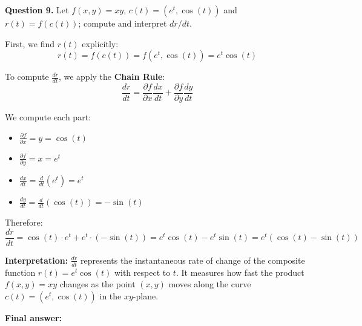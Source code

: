 \textbf{Question 9.} Let $f(x,y) = xy$, $c(t) = (e^t, \cos(t))$ and $r(t) = f(c(t))$; compute and interpret $dr/dt$.
\begin{respuesta}

First, we find $r(t)$ explicitly:
$$r(t) = f(c(t)) = f(e^t, \cos(t)) = e^t \cos(t)$$

To compute $\frac{dr}{dt}$, we apply the \textbf{Chain Rule}:
$$\frac{dr}{dt} = \frac{\partial f}{\partial x}\frac{dx}{dt} + \frac{\partial f}{\partial y}\frac{dy}{dt}$$

We compute each part:
\begin{itemize}
    \item $\frac{\partial f}{\partial x} = y = \cos(t)$
    \item $\frac{\partial f}{\partial y} = x = e^t$
    \item $\frac{dx}{dt} = \frac{d}{dt}(e^t) = e^t$
    \item $\frac{dy}{dt} = \frac{d}{dt}(\cos(t)) = -\sin(t)$
\end{itemize}

Therefore:
$$\frac{dr}{dt} = \cos(t) \cdot e^t + e^t \cdot (-\sin(t)) = e^t\cos(t) - e^t\sin(t) = e^t(\cos(t) - \sin(t))$$

\textbf{Interpretation:} $\frac{dr}{dt}$ represents the instantaneous rate of change of the composite function $r(t) = e^t\cos(t)$ with respect to $t$. It measures how fast the product $f(x,y) = xy$ changes as the point $(x,y)$ moves along the curve $c(t) = (e^t, \cos(t))$ in the $xy$-plane.

    \textbf{Final answer:}
    \begin{center}
    \end{center}
\end{respuesta}






